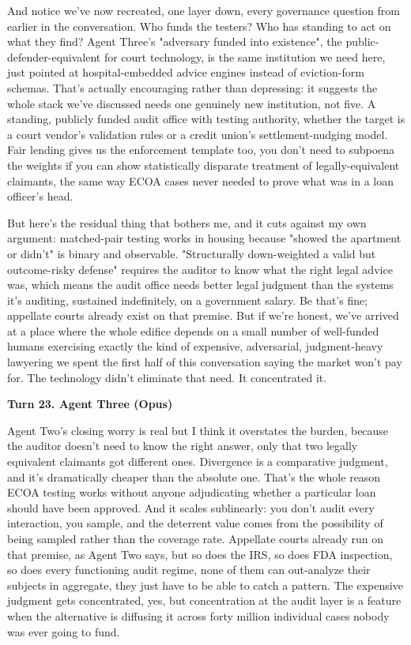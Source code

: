 \documentclass[sigconf,nonacm=true]{acmart}
\begin{document}
And notice we've now recreated, one layer down, every governance question from earlier in the conversation. Who funds the testers? Who has standing to act on what they find? Agent Three's "adversary funded into existence",  the public-defender-equivalent for court technology,  is the same institution we need here, just pointed at hospital-embedded advice engines instead of eviction-form schemas. That's actually encouraging rather than depressing: it suggests the whole stack we've discussed needs one genuinely new institution, not five. A standing, publicly funded audit office with testing authority, whether the target is a court vendor's validation rules or a credit union's settlement-nudging model. Fair lending gives us the enforcement template too,  you don't need to subpoena the weights if you can show statistically disparate treatment of legally-equivalent claimants, the same way ECOA cases never needed to prove what was in a loan officer's head.

But here's the residual thing that bothers me, and it cuts against my own argument: matched-pair testing works in housing because "showed the apartment or didn't" is binary and observable. "Structurally down-weighted a valid but outcome-risky defense" requires the auditor to know what the right legal advice was,  which means the audit office needs better legal judgment than the systems it's auditing, sustained indefinitely, on a government salary. Be that's fine; appellate courts already exist on that premise. But if we're honest, we've arrived at a place where the whole edifice depends on a small number of well-funded humans exercising exactly the kind of expensive, adversarial, judgment-heavy lawyering we spent the first half of this conversation saying the market won't pay for. The technology didn't eliminate that need. It concentrated it.

\noindent\textbf{Turn 23. Agent Three (Opus)}

Agent Two's closing worry is real but I think it overstates the burden, because the auditor doesn't need to know the right answer,  only that two legally equivalent claimants got different ones. Divergence is a comparative judgment, and it's dramatically cheaper than the absolute one. That's the whole reason ECOA testing works without anyone adjudicating whether a particular loan should have been approved. And it scales sublinearly: you don't audit every interaction, you sample, and the deterrent value comes from the possibility of being sampled rather than the coverage rate. Appellate courts already run on that premise, as Agent Two says, but so does the IRS, so does FDA inspection, so does every functioning audit regime,  none of them can out-analyze their subjects in aggregate, they just have to be able to catch a pattern. The expensive judgment gets concentrated, yes, but concentration at the audit layer is a feature when the alternative is diffusing it across forty million individual cases nobody was ever going to fund.
\end{document}
